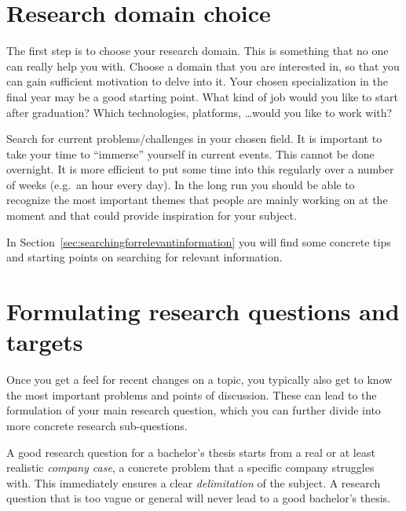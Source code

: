 \section{Research domain choice}
\label{sec:research}

The first step is to choose your research domain. This is something that no one can really help you with. Choose a domain that you are interested in, so that you can gain sufficient motivation to delve into it. Your chosen specialization in the final year may be a good starting point. What kind of job would you like to start after graduation? Which technologies, platforms, \ldots would you like to work with?

Search for current problems/challenges in your chosen field. It is important to take your time to ``immerse'' yourself in current events. This cannot be done overnight. It is more efficient to put some time into this regularly over a number of weeks (e.g.\ an hour every day). In the long run you should be able to recognize the most important themes that people are mainly working on at the moment and that could provide inspiration for your subject.

In Section~\ref{sec:searchingforrelevantinformation} you will find some concrete tips and starting points on searching for relevant information. 

\section{Formulating research questions and targets}
\label{sec:formulatingresearchquestion}

Once you get a feel for recent changes on a topic, you typically also get to know the most important problems and points of discussion. These can lead to the formulation of your main research question, which you can further divide into more concrete research sub-questions.

A good research question for a bachelor's thesis starts from a real or at least realistic \textit{company case}, a concrete problem that a specific company struggles with. This immediately ensures a clear \textit{delimitation} of the subject. A research question that is too vague or general will never lead to a good bachelor's thesis.

